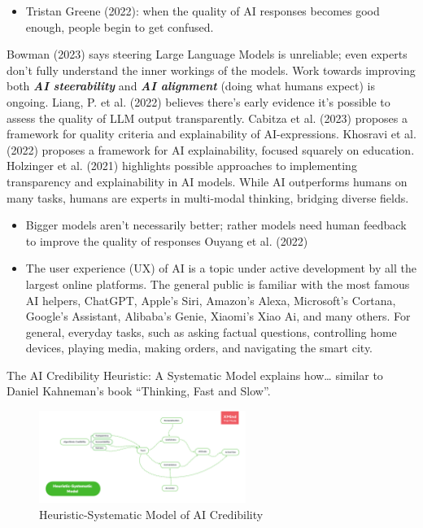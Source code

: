 \documentclass[
  letterpaper,
  DIV=11,
  numbers=noendperiod]{scrartcl}
\providecommand{\tightlist}{%
  \setlength{\itemsep}{0pt}\setlength{\parskip}{0pt}}\usepackage{longtable,booktabs,array}
\begin{document}
\begin{itemize}
\tightlist
\item
  Tristan Greene (2022): when the quality of AI responses becomes good
  enough, people begin to get confused.
\end{itemize}

Bowman (2023) says steering Large Language Models is unreliable; even
experts don't fully understand the inner workings of the models. Work
towards improving both \textbf{\emph{AI steerability}} and
\textbf{\emph{AI alignment}} (doing what humans expect) is ongoing.
Liang, P. et al. (2022) believes there's early evidence it's possible to
assess the quality of LLM output transparently. Cabitza et al. (2023)
proposes a framework for quality criteria and explainability of
AI-expressions. Khosravi et al. (2022) proposes a framework for AI
explainability, focused squarely on education. Holzinger et al. (2021)
highlights possible approaches to implementing transparency and
explainability in AI models. While AI outperforms humans on many tasks,
humans are experts in multi-modal thinking, bridging diverse fields.

\begin{itemize}
\item
  Bigger models aren't necessarily better; rather models need human
  feedback to improve the quality of responses Ouyang et al. (2022)
\item
  The user experience (UX) of AI is a topic under active development by
  all the largest online platforms. The general public is familiar with
  the most famous AI helpers, ChatGPT, Apple's Siri, Amazon's Alexa,
  Microsoft's Cortana, Google's Assistant, Alibaba's Genie, Xiaomi's
  Xiao Ai, and many others. For general, everyday tasks, such as asking
  factual questions, controlling home devices, playing media, making
  orders, and navigating the smart city.
\end{itemize}

The AI Credibility Heuristic: A Systematic Model explains how\ldots{}
similar to Daniel Kahneman's book ``Thinking, Fast and Slow''.

\begin{figure}[H]

{\centering \includegraphics[width=0.6\textwidth,height=\textheight]{../images/ai-credibility-heuristic-systematic-model.png}

}

\caption{Heuristic-Systematic Model of AI Credibility}

\end{figure}%
\end{document}
